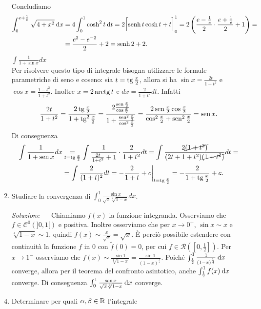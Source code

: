 \documentclass{article}
\begin{document}
\begin{enumerate}[label=\textbf{Esercizio 11.\arabic*.},itemindent=*]
\begin{tasks}
   Concludiamo
    \[\begin{aligned}\int_{0}^{e +\frac{1}{e}}\sqrt{4 +x^2}\:\text{d} x &= 4\int_0^1\cosh^2t\:\text{d} t = 2\biggl[\operatorname{senh} t\cosh t +t\biggr]_0^1=2\left( \frac{e-\frac{1}{e}}{2} \cdot \frac{
    e+\frac{1}{e}}{2} +1\right)= \\&=\frac{e^2 - e^{ - 2}}{2} + 2 = \operatorname{senh} 2 + 2.\end{aligned}\]
    \task \(\int\frac{1}{1+\sin x}dx\)\\
    Per risolvere questo tipo di integrale bisogna utilizzare le formule parametriche di seno e coseno: sia $t=\operatorname{tg}\frac{x}{2}$, allora si ha $\sin x= \frac{2t}{1+t^2}$ e $\cos x= \frac{1-t^2}{1+t^2}$. Inoltre $x=2\operatorname{arctg} t$ e $dx =\frac{2}{1+t^2}dt$. 
    Infatti
    \[\frac{2t}{1+t^2}=\frac{2\operatorname{tg}\frac{x}{2}}{1+\operatorname{tg}^2\frac{x}{2}}=\frac{2\frac{\operatorname{sen} \frac{x}{2}}{\cos \frac{x}{2}}}{1+\frac{\operatorname{sen} ^2\frac{x}{2}}{\cos^2 \frac{x}{2}}}=\frac{2\operatorname{sen} \frac{x}{2}\cos \frac{x}{2}}{\cos^2\frac{x}{2}+\operatorname{sen}^2 \frac{x}{2}}=\operatorname{sen} x.\]
    Di conseguenza
    \[\begin{aligned}\int\frac{1}{1+\operatorname{sen} x}dx&\underset{t = \operatorname{tg} \frac{x}{2}}{=}\int\frac{1}{\frac{2t}{1+t^2}+1}\cdot \frac{2}{1+t^2}dt=\int \frac{2\cancel{(1+t^2)}}{(2t+1+t^2)\cancel{(1+t^2)}}dt=\\&=\int \frac{2}{(1+ t)^2}dt=-\frac{2}{1+ t}+c\bigg|_{t =\operatorname{tg}\frac{x}{2}}=-\frac{2}{1+\operatorname{tg} \frac{x}{2}}+ c.\end{aligned}\]
\end{tasks}
\item Studiare la convergenza di $\int_0^1\frac{\sin x}{\sqrt{x}\sqrt[4]{1-x}}dx$.
\item[\textit{\large Soluzione~}]~ Chiamiamo $f(x)$ la funzione integranda. Osserviamo che $f\in \mathcal{C}^0(]0,1[)$ e positiva. Inoltre osserviamo che per $x\to 0^+$, $\sin x\sim x$ e $\sqrt[4]{1-x}\sim 1$, quindi $f(x)\sim \frac{x}{\sqrt{x}}=\sqrt{x}$. È perciò possibile estendere con continuità la funzione $f$ in 0 con $\tilde{f}(0)=0$, per cui $f\in \mathcal{R}\left(\left[0,\frac{1}{2}\right]\right)$. Per $x\to1^-$ osserviamo che $f(x)\sim\frac{\sin 1}{\sqrt[4]{1-x}}=\frac{\sin 1}{(1-x)^{\frac{1}{4}}}$. Poiché $\int_{\frac{1}{2}}^1\frac{1}{(1-x)^{\frac{1}{4}}}\:\text{d} x$ converge, allora per il teorema del confronto asintotico, anche $\int_{\frac{1}{2}}^1f(x)\:\text{d} x$ converge. Di conseguenza $\int_0^1\frac{\operatorname{sen} x}{\sqrt{x}\sqrt[4]{1-x}}\:\text{d} x$ converge.
\item Determinare per quali $\alpha, \beta\in \mathbb{R}$ l'integrale

\end{enumerate}
\end{document}
